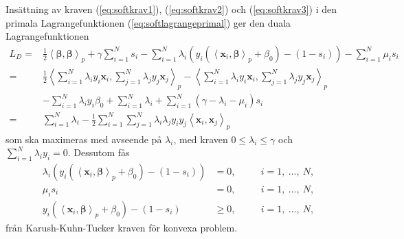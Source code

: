 \documentclass[a4paper, 12pt]{report}
\theoremstyle{definition}
\theoremstyle{remark}
\newcommand{\bfbeta}{{\boldsymbol{\beta}}}
\newcommand{\bfx}{\mathbf{x}}
\newcommand{\llangle}{\left\langle}
\newcommand{\rrangle}{\right\rangle}
\newcommand{\inner}[2]{\llangle #1, #2 \rrangle}
\begin{document}
Insättning av kraven (\ref{eq:softkrav1}), (\ref{eq:softkrav2}) och (\ref{eq:softkrav3}) i den primala Lagrangefunktionen (\ref{eq:softlagrangeprimal}) ger den duala Lagrangefunktionen
\begin{align*}
	L_D = &\frac{1}{2}\inner{\bfbeta}{\bfbeta}_p + \gamma\sum_{i=1}^{N}s_i - \sum_{i=1}^{N}\lambda_i\left(y_i\left(\inner{\bfx_i}{\bfbeta}_p+\beta_0\right)-\left(1-s_i\right)\right) - \sum_{i=1}^{N}\mu_is_i\\
	= &\frac{1}{2}\inner{\sum_{i=1}^{N}\lambda_i y_i \bfx_i}{\sum_{j=1}^{N}\lambda_j y_j \bfx_j}_p - \inner{\sum_{i=1}^{N}\lambda_i y_i \bfx_i}{\sum_{j=1}^{N}\lambda_j y_j \bfx_j}_p\\
	&-\sum_{i=1}^{N}\lambda_iy_i\beta_0 + \sum_{i=1}^{N}\lambda_i + \sum_{i=1}^{N}\left(\gamma - \lambda_i - \mu_i\right)s_i\\
	= &\sum_{i=1}^{N}\lambda_i - \frac{1}{2}\sum_{i=1}^{N}\sum_{j=1}^{N}\lambda_i\lambda_jy_iy_j\inner{\bfx_i}{\bfx_j}_p
\end{align*}
som ska maximeras med avseende på $\lambda_i$, med kraven $0\leq\lambda_i\leq\gamma$ och $\sum_{i=1}^{N}\lambda_iy_i=0$. Dessutom fås
\begin{align}
\label{eq:softkrav7}	\lambda_i\left( y_i\left(\inner{\bfx_i}{\bfbeta}_p + \beta_0\right) - \left(1-s_i\right)\right) &= 0, \quad & &i = 1,~\dots,~N,\\
\label{eq:softkrav8}	\mu_is_i&=0, \quad & &i = 1,~\dots,~N,\\
\label{eq:softkrav9}	y_i\left(\inner{\bfx_i}{\bfbeta}_p+\beta_0\right)-\left(1-s_i\right) &\geq 0, \quad & &i = 1,~\dots,~N,
\end{align}
från Karush-Kuhn-Tucker kraven för konvexa problem.
\end{document}
